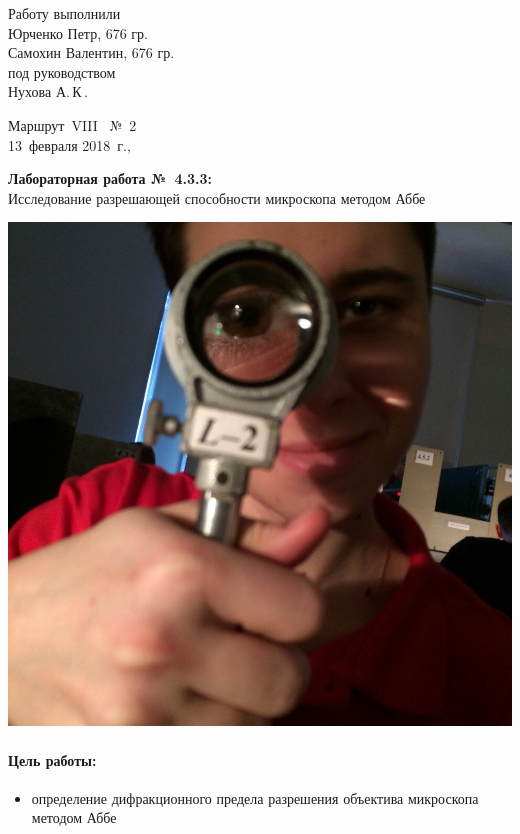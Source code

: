\documentclass[12pt]{article}
\begin{document}
	\begin{minipage}{0.45\linewidth}
	Работу выполнили\\
	Юрченко Петр, 676 гр.\\
	Самохин Валентин, 676 гр.\\[2mm]
	под руководством\\
	Нухова А.\,К\,.
	\end{minipage}
	\hfill
	\begin{minipage}{0.45\linewidth}\flushright
		Маршрут~VIII \ №~2\\[3mm]
		13~февраля 2018~г.,\\
		\end{minipage}
		
		\vspace{8mm}
		\begin{center}
			\textbf{\Large Лабораторная работа №~4.3.3:}\\[\parskip]
			\LARGE Исследование разрешающей способности микроскопа методом Аббе
			\end{center}
			\vspace{0mm}
			
			\begin{center}
				\includegraphics[scale = 0.4]{petrovich}
			\end{center}
		\thispagestyle{empty}
		\newpage
			\paragraph{Цель работы:}
			\begin{itemize}
				\item определение дифракционного предела разрешения объектива микроскопа методом Аббе
			\end{itemize}
			
\end{document}
